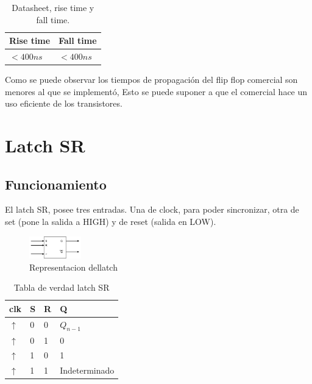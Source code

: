 \documentclass[../../e3_tp2_main.tex]{subfiles}
\begin{document}
\begin{table}[H]
\begin{center}
\begin{tabular}{|l|l|}
\hline
Rise time& Fall time \\
\hline \hline
$<400 n s$  & $<400 n s$ \\ \hline
\end{tabular}
\caption{Datasheet, rise time y fall time.} 
\end{center}
\end{table}

Como se puede observar los tiempos de propagación del flip flop comercial son menores al que se implementó, Esto se puede suponer a que el comercial hace un uso eficiente de los transistores.

\section{Latch SR}

\subsection{Funcionamiento}
El latch SR, posee tres entradas. Una de clock, para poder sincronizar, otra de set (pone la salida a HIGH) y de reset (salida en LOW).
\begin{figure}[H]	
	\centering
	\includegraphics[width=0.2\textwidth]{imagenes/lsr_b.png}
	\caption{Representacion dellatch}
\end{figure}

\begin{table}[h]
\begin{center}
\begin{tabular}{|l|l|l|l|}
\hline
clk&S & R & Q\\
\hline \hline
$\uparrow$ & 0 & 0 & $Q_{n-1}$ \\ \hline
$\uparrow$ & 0 & 1 &0 \\ \hline
$\uparrow$ & 1 & 0 & 1 \\ \hline
$\uparrow$ & 1 &1 & Indeterminado \\ \hline

\end{tabular}
\caption{Tabla de verdad latch  SR} 
\end{center}
\end{table}
\end{document}
